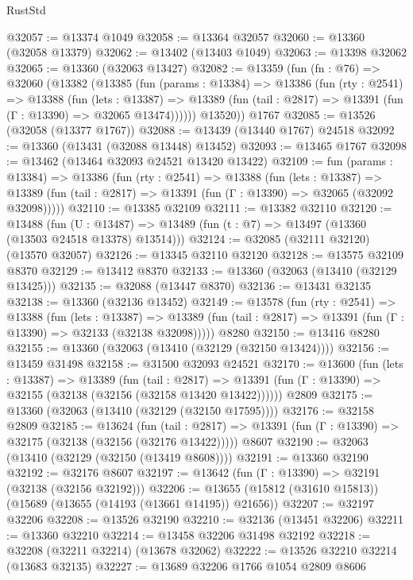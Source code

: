 \begin{lexlean}{RustStd}
\begin{coremodule}
@32057 := @13374 @1049
@32058 := @13364 @32057
@32060 := @13360 (@32058 @13379)
@32062 := @13402 (@13403 @1049)
@32063 := @13398 @32062
@32065 := @13360 (@32063 @13427)
@32082 := @13359
    (fun (fn : @76) =>
    @32060
      (@13382
        (@13385
          (fun (params : @13384) =>
          @13386
            (fun (rty : @2541) =>
            @13388
              (fun (lets : @13387) =>
              @13389 (fun (tail : @2817) => @13391 (fun (Γ : @13390) => @32065 @13474))))))
        @13520))
    @1767
@32085 := @13526 (@32058 (@13377 @1767))
@32088 := @13439 (@13440 @1767) @24518
@32092 := @13360 (@13431 (@32088 @13448) @13452)
@32093 := @13465 @1767
@32098 := @13462 (@13464 @32093 @24521 @13420 @13422)
@32109 := fun (params : @13384) =>
  @13386
    (fun (rty : @2541) =>
    @13388
      (fun (lets : @13387) =>
      @13389 (fun (tail : @2817) => @13391 (fun (Γ : @13390) => @32065 (@32092 @32098)))))
@32110 := @13385 @32109
@32111 := @13382 @32110
@32120 := @13488
    (fun (U : @13487) => @13489 (fun (t : @7) => @13497 (@13360 (@13503 @24518 @13378) @13514)))
@32124 := @32085 (@32111 @32120) (@13570 @32057)
@32126 := @13345 @32110 @32120
@32128 := @13575 @32109 @8370
@32129 := @13412 @8370
@32133 := @13360 (@32063 (@13410 (@32129 @13425)))
@32135 := @32088 (@13447 @8370)
@32136 := @13431 @32135
@32138 := @13360 (@32136 @13452)
@32149 := @13578
    (fun (rty : @2541) =>
    @13388
      (fun (lets : @13387) =>
      @13389 (fun (tail : @2817) => @13391 (fun (Γ : @13390) => @32133 (@32138 @32098)))))
    @8280
@32150 := @13416 @8280
@32155 := @13360 (@32063 (@13410 (@32129 (@32150 @13424))))
@32156 := @13459 @31498
@32158 := @31500 @32093 @24521
@32170 := @13600
    (fun (lets : @13387) =>
    @13389
      (fun (tail : @2817) =>
      @13391 (fun (Γ : @13390) => @32155 (@32138 (@32156 (@32158 @13420 @13422))))))
    @2809
@32175 := @13360 (@32063 (@13410 (@32129 (@32150 @17595))))
@32176 := @32158 @2809
@32185 := @13624
    (fun (tail : @2817) => @13391 (fun (Γ : @13390) => @32175 (@32138 (@32156 (@32176 @13422)))))
    @8607
@32190 := @32063 (@13410 (@32129 (@32150 (@13419 @8608))))
@32191 := @13360 @32190
@32192 := @32176 @8607
@32197 := @13642 (fun (Γ : @13390) => @32191 (@32138 (@32156 @32192)))
@32206 := @13655 (@15812 (@31610 @15813)) (@15689 (@13655 (@14193 (@13661 @14195)) @21656))
@32207 := @32197 @32206
@32208 := @13526 @32190
@32210 := @32136 (@13451 @32206)
@32211 := @13360 @32210
@32214 := @13458 @32206 @31498 @32192
@32218 := @32208 (@32211 @32214) (@13678 @32062)
@32222 := @13526 @32210 @32214 (@13683 @32135)
@32227 := @13689 @32206 @1766 @1054 @2809 @8606

\end{coremodule}
\end{lexlean}
